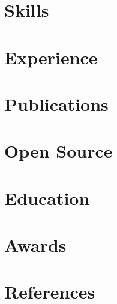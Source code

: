 \documentclass[a4paper]{resume}
\begin{document}
\def \sepspace {\vspace{1em}}
\makeheader{\contactemail}{\contactwebsite}{\contactphone}
\section{Skills}{\skillstechnical}
\section{Experience}{\experience}
\section{Publications}{\publications}
\section{Open Source}{\projects}
\section{Education}{\education}
\section{Awards}{\awards}
\section{References}{}
\end{document}
